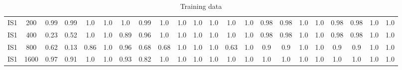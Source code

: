 \documentclass[10pt]{article}
\begin{document}
\begin{table}
\begin{tabular}{ cc||c c c c | c c c c | c c c c | c c c c| c c c c}
 					IS1 & 200 & 0.99 & 0.99 & 1.0 & 1.0 & 1.0 & 0.99 & 1.0 & 1.0& 1.0 & 1.0 & 1.0 & 1.0& 0.98 & 0.98 & 1.0 & 1.0 & 0.98 & 0.98 & 1.0 & 1.0\\ 
 					IS1 & 400 & 0.23 & 0.52 & 1.0 & 1.0 & 0.89 & 0.96 & 1.0 & 1.0& 1.0 & 1.0 & 1.0 & 1.0& 0.98 & 0.98 & 1.0 & 1.0 & 0.98 & 0.98 & 1.0 & 1.0\\ 
 					IS1 & 800 & 0.62 & 0.13 & 0.86 & 1.0 & 0.96 & 0.68 & 0.68 & 1.0& 1.0 & 1.0 & 0.63 & 1.0& 0.9 & 0.9 & 1.0 & 1.0 & 0.9 & 0.9 & 1.0 & 1.0\\ 
 					IS1 & 1600 & 0.97 & 0.91 & 1.0 & 1.0 & 0.93 & 0.82 & 1.0 & 1.0& 1.0 & 1.0 & 1.0 & 1.0& 1.0 & 1.0 & 1.0 & 1.0 & 1.0 & 1.0 & 1.0 & 1.0\\ \hline
 \hline
  \end{tabular}
  \caption{Training data}
\end{table}
\end{document}
